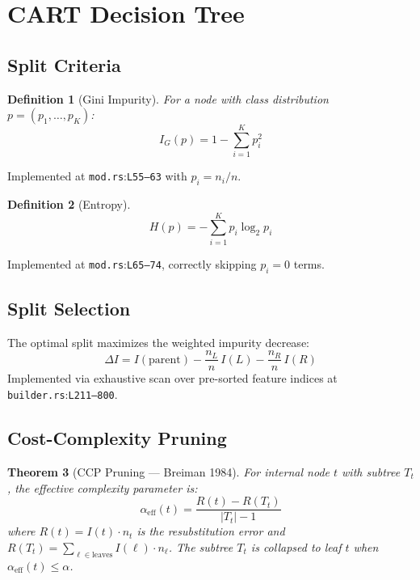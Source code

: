 \documentclass[11pt,a4paper]{article}
\newtheorem{theorem}{Theorem}[section]
\newtheorem{definition}[theorem]{Definition}
\theoremstyle{remark}
\newcommand{\coderef}[2]{\texttt{#1}:\texttt{L#2}}
\begin{document}
\section{CART Decision Tree}
\label{sec:cart}

\subsection{Split Criteria}

\begin{definition}[Gini Impurity]
For a node with class distribution $p = (p_1, \ldots, p_K)$:
\begin{equation}
  I_G(p) = 1 - \sum_{i=1}^{K} p_i^2
  \label{eq:gini}
\end{equation}
\end{definition}
Implemented at \coderef{mod.rs}{55--63} with $p_i = n_i / n$.

\begin{definition}[Entropy]
\begin{equation}
  H(p) = -\sum_{i=1}^{K} p_i \log_2 p_i
  \label{eq:entropy}
\end{equation}
\end{definition}
Implemented at \coderef{mod.rs}{65--74}, correctly skipping $p_i = 0$
terms.

\subsection{Split Selection}

The optimal split maximizes the weighted impurity decrease:
\begin{equation}
  \Delta I = I(\text{parent}) - \frac{n_L}{n}\, I(L) - \frac{n_R}{n}\, I(R)
  \label{eq:split-gain}
\end{equation}
Implemented via exhaustive scan over pre-sorted feature indices at
\coderef{builder.rs}{211--800}.

\subsection{Cost-Complexity Pruning}

\begin{theorem}[CCP Pruning --- Breiman 1984]
\label{thm:ccp}
For internal node $t$ with subtree $T_t$, the effective complexity parameter is:
\begin{equation}
  \alpha_{\text{eff}}(t) = \frac{R(t) - R(T_t)}{|T_t| - 1}
  \label{eq:alpha-eff}
\end{equation}
where $R(t) = I(t) \cdot n_t$ is the resubstitution error and
$R(T_t) = \sum_{\ell \in \text{leaves}} I(\ell) \cdot n_\ell$.
The subtree $T_t$ is collapsed to leaf $t$ when $\alpha_{\text{eff}}(t) \leq \alpha$.
\end{theorem}
\end{document}
